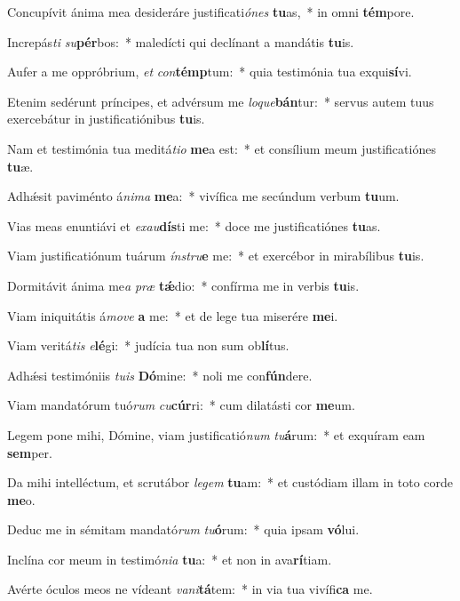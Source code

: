 \item Concupívit ánima mea desideráre justificati\textit{ó}\textit{nes} \textbf{tu}as,~* in omni \textbf{tém}pore.
\item Increpás\textit{ti} \textit{su}\textbf{pér}bos:~* maledícti qui declínant a mandátis \textbf{tu}is.
\item Aufer a me oppróbrium, \textit{et} \textit{con}\textbf{témp}tum:~* quia testimónia tua exqui\textbf{sí}vi.
\item Etenim sedérunt príncipes, et advérsum me \textit{lo}\textit{que}\textbf{bán}tur:~* servus autem tuus exercebátur in justificatiónibus \textbf{tu}is.
\item Nam et testimónia tua meditá\textit{ti}\textit{o} \textbf{me}a est:~* et consílium meum justificatiónes \textbf{tu}æ.
\item Adhǽsit paviménto á\textit{ni}\textit{ma} \textbf{me}a:~* vivífica me secúndum verbum \textbf{tu}um.
\item Vias meas enuntiávi et \textit{ex}\textit{au}\textbf{dís}ti me:~* doce me justificatiónes \textbf{tu}as.
\item Viam justificatiónum tuárum \textit{ín}\textit{stru}\textbf{e} me:~* et exercébor in mirabílibus \textbf{tu}is.
\item Dormitávit ánima me\textit{a} \textit{præ} \textbf{tǽ}dio:~* confírma me in verbis \textbf{tu}is.
\item Viam iniquitátis á\textit{mo}\textit{ve} \textbf{a} me:~* et de lege tua miserére \textbf{me}i.
\item Viam veritá\textit{tis} \textit{e}\textbf{lé}gi:~* judícia tua non sum ob\textbf{lí}tus.
\item Adhǽsi testimóniis \textit{tu}\textit{is} \textbf{Dó}mine:~* noli me con\textbf{fún}dere.
\item Viam mandatórum tuó\textit{rum} \textit{cu}\textbf{cúr}ri:~* cum dilatásti cor \textbf{me}um.
\item Legem pone mihi, Dómine, viam justificatió\textit{num} \textit{tu}\textbf{á}rum:~* et exquíram eam \textbf{sem}per.
\item Da mihi intelléctum, et scrutábor \textit{le}\textit{gem} \textbf{tu}am:~* et custódiam illam in toto corde \textbf{me}o.
\item Deduc me in sémitam mandató\textit{rum} \textit{tu}\textbf{ó}rum:~* quia ipsam \textbf{vó}lui.
\item Inclína cor meum in testimó\textit{ni}\textit{a} \textbf{tu}a:~* et non in ava\textbf{rí}tiam.
\item Avérte óculos meos ne vídeant \textit{va}\textit{ni}\textbf{tá}tem:~* in via tua vivífi\textbf{ca} me.
